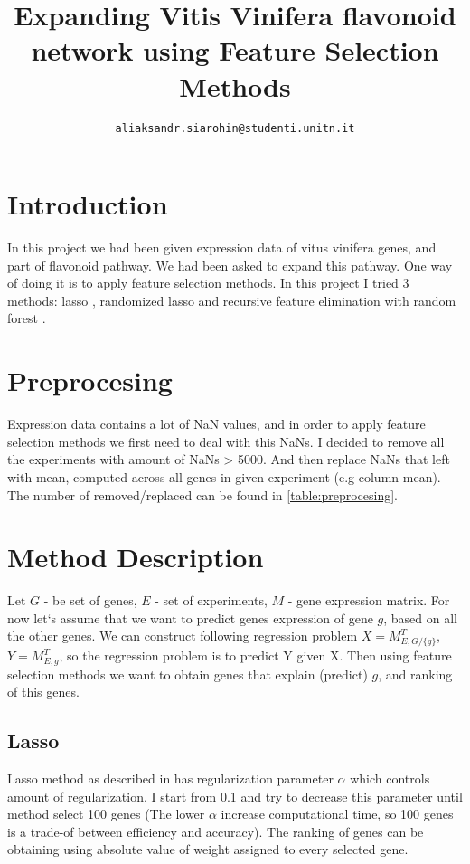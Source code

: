 \documentclass[conference]{IEEEtran}
\begin{document}
\title{Expanding Vitis Vinifera flavonoid network using Feature Selection Methods}

\author{
	\texttt{aliaksandr.siarohin@studenti.unitn.it}
}

\maketitle

\acresetall

\section{Introduction}
In this project we had been given expression data of vitus vinifera genes, and part of flavonoid pathway. We had been asked to expand this pathway. One way of doing it is to apply feature selection methods. In this project I tried 3 methods: lasso \cite{lasso}, randomized lasso \cite{randomized_lasso} and recursive feature elimination \cite{rfe} with random forest \cite{random_forest}.

\section{Preprocesing}
Expression data contains a lot of NaN values, and in order to apply feature selection methods we first need to deal with this NaNs. I decided to remove all the experiments with amount of NaNs > 5000. And then replace NaNs that left with mean, computed across all genes in given experiment (e.g column mean). The number of removed/replaced can be found in \cref{table:preprocesing}.

\section{Method Description}
Let $G$ - be set of genes, $E$ - set of experiments, $M$ - gene expression matrix. For now let`s assume that we want to predict genes expression of gene $g$, based on all the other genes. We can construct following regression problem $X = M_{E, G/{\{g\}}}^T$, $Y = M_{E, g}^T$, so the regression problem is to predict Y given X. Then using feature selection methods we want to obtain genes that explain (predict) $g$, and ranking of this genes.
\subsection{Lasso}
Lasso method as described in \cite{lasso} has regularization parameter $\alpha$ which controls amount of regularization. I start from 0.1 and try to decrease this parameter until method select 100 genes (The lower $\alpha$ increase computational time, so 100 genes is a trade-of between efficiency and accuracy).
The ranking of genes can be obtaining using absolute value of weight assigned to every selected gene.
\end{document}
